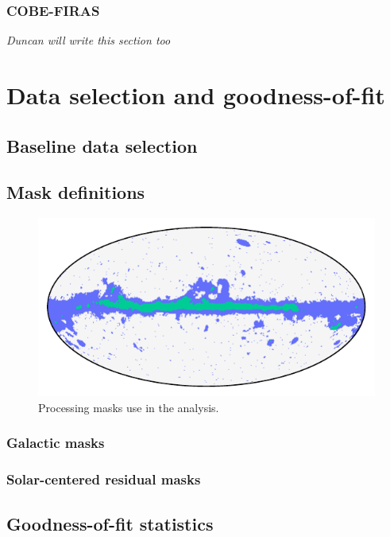 \documentclass{aa}
\begin{document}
\subsubsection{COBE-FIRAS}

\textit{Duncan will write this section too}


\section{Data selection and goodness-of-fit}
\label{sec:data_selection}

\subsection{Baseline data selection}

\subsection{Mask definitions}

\begin{figure}
  \centering
  \includegraphics[width=\columnwidth]{figs/mask_proc_calib.pdf}
  \caption{Processing masks use in the analysis.}
  \label{fig:masks}
\end{figure}


\subsubsection{Galactic masks}

\subsubsection{Solar-centered residual masks}

\subsection{Goodness-of-fit statistics}
\end{document}
